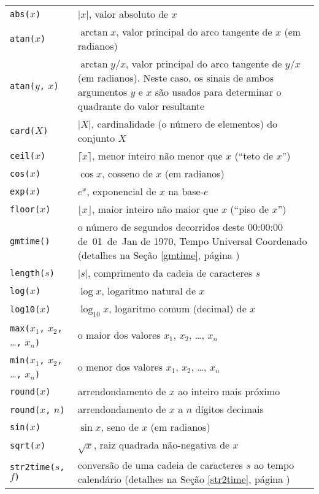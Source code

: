 \documentclass[11pt, brazil]{report}
\begin{document}
\begin{tabular}{@{}p{112pt}p{328pt}@{}}
{\tt abs(}$x${\tt)}&$|x|$, valor absoluto de $x$\\
{\tt atan(}$x${\tt)}&$\arctan x$, valor principal do arco tangente de
$x$ (em radianos)\\
{\tt atan(}$y${\tt,} $x${\tt)}&$\arctan y/x$, valor principal do
arco tangente de $y/x$ (em radianos). Neste caso, os sinais de ambos
argumentos $y$ e $x$ são usados para determinar o quadrante do valor
resultante\\
{\tt card(}$X${\tt)}&$|X|$, cardinalidade (o número de elementos) do
conjunto $X$\\
{\tt ceil(}$x${\tt)}&$\lceil x\rceil$, menor inteiro não menor que
$x$ (``teto de $x$'')\\
{\tt cos(}$x${\tt)}&$\cos x$, cosseno de $x$ (em radianos)\\
{\tt exp(}$x${\tt)}&$e^x$, exponencial de $x$ na base-$e$\\
{\tt floor(}$x${\tt)}&$\lfloor x\rfloor$, maior inteiro não maior
que $x$ (``piso de $x$'')\\
{\tt gmtime()}&o número de segundos decorridos deste 00:00:00 de~01~de~Jan de 1970,
Tempo Universal Coordenado (detalhes na Seção \ref{gmtime},
página \pageref{gmtime})\\
{\tt length(}$s${\tt)}&$|s|$, comprimento da cadeia de caracteres $s$\\
{\tt log(}$x${\tt)}&$\log x$, logaritmo natural de $x$\\
{\tt log10(}$x${\tt)}&$\log_{10}x$, logaritmo comum (decimal) de $x$\\
{\tt max(}$x_1${\tt,} $x_2${\tt,} \dots{\tt,} $x_n${\tt)}&o maior
dos valores $x_1$, $x_2$, \dots, $x_n$\\
{\tt min(}$x_1${\tt,} $x_2${\tt,} \dots{\tt,} $x_n${\tt)}&o menor
dos valores $x_1$, $x_2$, \dots, $x_n$\\
{\tt round(}$x${\tt)}&arrendondamento de $x$ ao inteiro mais próximo\\
{\tt round(}$x${\tt,} $n${\tt)}&arrendondamento de $x$ a $n$ dígitos decimais\\
{\tt sin(}$x${\tt)}&$\sin x$, seno de $x$ (em radianos)\\
{\tt sqrt(}$x${\tt)}&$\sqrt{x}$, raiz quadrada não-negativa de $x$\\
{\tt str2time(}$s${\tt,} $f${\tt)}&conversão de uma cadeia de caracteres $s$ ao
tempo calendário (detalhes na Seção \ref{str2time}, página
\pageref{str2time})\\

\end{tabular}
\end{document}
